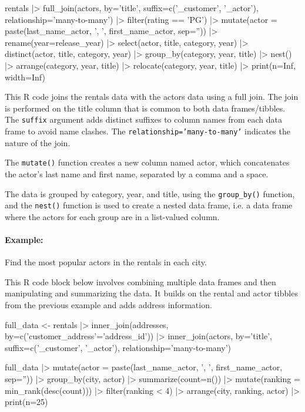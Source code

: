 \begin{samepage}
\begin{Rcode}
rentals |> 
  full_join(actors, by='title', 
    suffix=c('_customer', '_actor'), 
    relationship='many-to-many') |>
  filter(rating == 'PG') |>
  mutate(actor = 
    paste(last_name_actor, ', ', first_name_actor, sep='')) |>
  rename(year=release_year) |>
  select(actor, title, category, year) |>
  distinct(actor, title, category, year) |>
  group_by(category, year, title) |> 
  nest() |>
  arrange(category, year, title) |>
  relocate(category, year, title) |>
  print(n=Inf, width=Inf)
\end{Rcode}
\end{samepage}

This R code joins the rentals data with the actors data using a full join. The join is performed on the title column that is common to both data frames/tibbles. The \texttt{suffix} argument adds distinct suffixes to column names from each data frame to avoid name clashes. The \texttt{relationship='many-to-many'} indicates the nature of the join.

The \texttt{mutate()} function creates a new column named actor, which concatenates the actor's last name and first name, separated by a comma and a space.

The data is grouped by category, year, and title, using the \texttt{group\_by()} function, and the \texttt{nest()} function is used to create a nested data frame, i.e. a data frame where the actors for each group are in a list-valued column.

\paragraph*{Example:} Find the most popular actors in the rentals in each city.

This R code block below involves combining multiple data frames and then manipulating and summarizing the data. It builds on the rental and actor tibbles from the previous example and adds address information.

\begin{samepage}
\begin{Rcode}

full_data <- 
  rentals |> 
    inner_join(addresses, by=c('customer_address'='address_id')) |>
    inner_join(actors, by='title',
      suffix=c('_customer', '_actor'),
      relationship='many-to-many')
       
full_data |> 
  mutate(actor = 
    paste(last_name_actor, ', ', first_name_actor, sep='')) |>
  group_by(city, actor) |>
  summarize(count=n()) |>
  mutate(ranking = min_rank(desc(count))) |>
  filter(ranking < 4) |>
  arrange(city, ranking, actor) |>
  print(n=25)
\end{Rcode}
\end{samepage}

